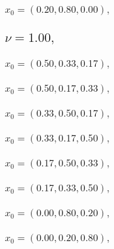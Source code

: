 \documentclass[a4paper]{article}
\begin{document}
\begin{multicols*}{2}
   \subsubsection{\(x_0 = (0.20,0.80,0.00),\quad \)}
   

   \subsection{\(\nu = 1.00,\quad \)}
   

   \subsubsection{\(x_0 = (0.50,0.33,0.17),\quad \)}
   

   \subsubsection{\(x_0 = (0.50,0.17,0.33),\quad \)}
   

   \subsubsection{\(x_0 = (0.33,0.50,0.17),\quad \)}
   

   \subsubsection{\(x_0 = (0.33,0.17,0.50),\quad \)}
   

   \subsubsection{\(x_0 = (0.17,0.50,0.33),\quad \)}
   

   \subsubsection{\(x_0 = (0.17,0.33,0.50),\quad \)}
   

   \subsubsection{\(x_0 = (0.00,0.80,0.20),\quad \)}
   

   \subsubsection{\(x_0 = (0.00,0.20,0.80),\quad \)}
   


\end{multicols*}
\end{document}
